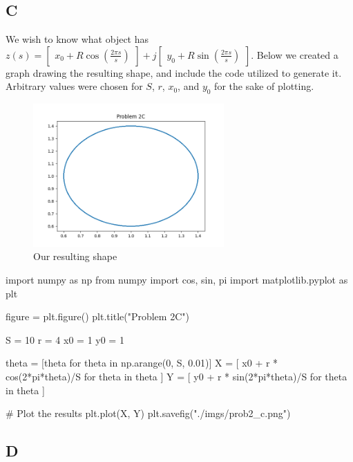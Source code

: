 \documentclass{article}
\begin{document}
\subsection*{C}

We wish to know what object has $z(s)=\begin{bmatrix}x_0 + R\cos(\frac{2\pi s}{s})\end{bmatrix}+j\begin{bmatrix}y_0 + R \sin(\frac{2\pi s}{s})\end{bmatrix}$. Below we created a graph drawing the resulting shape, and include the code utilized to generate it. Arbitrary values were chosen for $S$, $r$, $x_0$, and $y_0$ for the sake of plotting.

\begin{figure}[H]
    \centering
    \includegraphics[width = 0.65\textwidth]{imgs/prob2_c.png}
    \caption{Our resulting shape}
    \label{fig:prob2-c}
\end{figure}

\begin{python}
    import numpy as np
    from numpy import cos, sin, pi
    import matplotlib.pyplot as plt
    
    figure = plt.figure()
    plt.title("Problem 2C")
    
    S = 10
    r = 4
    x0 = 1
    y0 = 1
    
    theta = [theta for theta in np.arange(0, S, 0.01)]
    X = [
            x0 + r * cos(2*pi*theta)/S
            for theta in theta
        ]
    Y = [
            y0 + r * sin(2*pi*theta)/S
            for theta in theta
        ]
    
    # Plot the results
    plt.plot(X, Y)
    plt.savefig("./imgs/prob2_c.png")
\end{python}

\subsection*{D}
\end{document}
